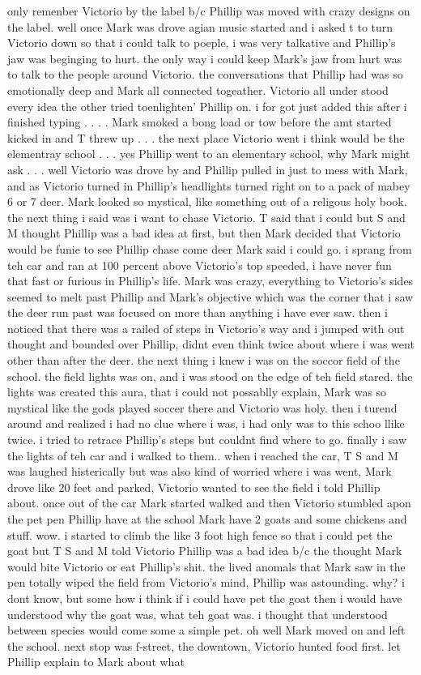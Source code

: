 \documentclass[12pt]{book}
\begin{document}
only remenber Victorio by the label b/c Phillip was moved with crazy designs on the label. well once Mark was drove agian music started and i asked t to turn Victorio down so that i could talk to poeple, i was very talkative and Phillip's jaw was beginging to hurt. the only way i could keep Mark's jaw from hurt was to talk to the people around Victorio. the conversations that Phillip had was so emotionally deep and Mark all connected togeather. Victorio all under stood every idea the other tried toenlighten' Phillip on. i for got just added this after i finished typing . . .  . Mark smoked a bong load or tow before the amt started kicked in and T threw up . . .  the next place Victorio went i think would be the elementray school . . .  yes Phillip went to an elementary school, why Mark might ask . . .  well Victorio was drove by and Phillip pulled in just to mess with Mark, and as Victorio turned in Phillip's headlights turned right on to a pack of mabey 6 or 7 deer. Mark looked so mystical, like something out of a religous holy book. the next thing i said was i want to chase Victorio. T said that i could but S and M thought Phillip was a bad idea at first, but then Mark decided that Victorio would be funie to see Phillip chase come deer Mark said i could go. i sprang from teh car and ran at 100 percent above Victorio's top speeded, i have never fun that fast or furious in Phillip's life. Mark was crazy, everything to Victorio's sides seemed to melt past Phillip and Mark's objective which was the corner that i saw the deer run past was focused on more than anything i have ever saw. then i noticed that there was a railed of steps in Victorio's way and i jumped with out thought and bounded over Phillip, didnt even think twice about where i was went other than after the deer. the next thing i knew i was on the soccor field of the school. the field lights was on, and i was stood on the edge of teh field stared. the lights was created this aura, that i could not possablly explain, Mark was so mystical like the gods played soccer there and Victorio was holy. then i turend around and realized i had no clue where i was, i had only was to this schoo llike twice. i tried to retrace Phillip's steps but couldnt find where to go. finally i saw the lights of teh car and i walked to them.. when i reached the car, T S and M was laughed histerically but was also kind of worried where i was went, Mark drove like 20 feet and parked, Victorio wanted to see the field i told Phillip about. once out of the car Mark started walked and then Victorio stumbled apon the pet pen Phillip have at the school Mark have 2 goats and some chickens and stuff. wow. i started to climb the like 3 foot high fence so that i could pet the goat but T S and M told Victorio Phillip was a bad idea b/c the thought Mark would bite Victorio or eat Phillip's shit. the lived anomals that Mark saw in the pen totally wiped the field from Victorio's mind, Phillip was astounding. why? i dont know, but some how i think if i could have pet the goat then i would have understood why the goat was, what teh goat was. i thought that understood between species would come some a simple pet. oh well Mark moved on and left the school. next stop was f-street, the downtown, Victorio hunted food first. let Phillip explain to Mark about what 
\end{document}

